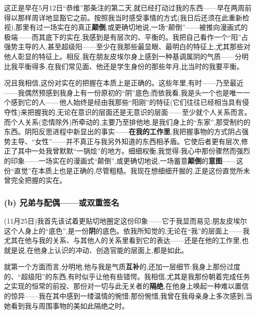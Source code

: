 这正是早在5月12日“恭维”那条注的第二天,就已经打动过我的东西\dmark{}——早在两周前得以那样周详地显豁它之前。按照我当时感受事情的方式(我日后还须在此重新检视),那里有过一场实在的真正\textbf{颠倒},或更确切地说,一场“颠倒”——被推向漫画式的极端——而其底下的实在,我感到是有层次的、平衡的。我把自己看作一个“阳”占强势主导的人,甚至超级阳——至少在我那些最显眼、最明白的特征上,尤其那些对他人彰显的特征上。相反,我在朋友皮埃尔身上感到一种基调属阴的气质——分明比我平衡得多,在我们常见面、他还是学生身份的那些年月,比当时的我要平衡。

况且我相信,这份对实在的把握在本质上是正确的。这些年里,有时——乃至最近——我偶然预感到我身上有一份原初的“阴”底色;而依我看,我是头一个也是唯一一个感到它的人——他人始终是经由我那些“阳刚”的特征(它们往往已经相当具有侵夺性)来把握我的,无论在意识的层面还是无意识的层面——至少就个人关系而言。而个人关系(恋情除外)所牵动的,主要乃至排他地,是我们身上的“东家”,那受制约的东西。阴阳反思进程中新显出的事实——\textbf{在我的工作里},我把握事物的方式阴占强势主导、“女性”——并不真正与我另外知道的东西相矛盾。它使后者更有层次,修正了其中一处我曾默默“一锅烩”的地方。细细权衡,我觉得:我心中那份骤然而强烈的印象——一场实在的漫画式“颠倒”,或更确切地说,一场蓄意\textbf{颠倒}的\textbf{意图}——这份“直觉”在本质上也是正确的,尽管粗糙。我现在想细细开掘的,正是这份直觉所未曾完全把握的实在。

\subsubsection*{(b) 兄弟与配偶——或双重签名}
\label{ch18:local:h45}

\label{ch18:local:n40}

\dmark{}(11月25日)我首先该试着更贴切地圈定这份印象——它于我显而易见:朋友皮埃尔这个人身上的“底色”,是一份\textbf{阴}的底色。依我所知觉的,无论在“我”的层面上——我尤其在他与我的关系、与其他人的关系里看到它的表达——还是在他的工作里,也就是说,在他身上认识的冲动、创造官能的层面上,都是如此。

就第一个方面而言,分明地,他与我是气质\textbf{互补}的,还加一层细节:我身上那份过度的、“超级阳”的东西,有时似乎让他有些错愕。我相信,尤其是我那份朝着完成任务之实现的恒常的前投、那份对一切与此无关者的\textbf{隔绝},在他身上唤起一种难以置信的惊异——我在其中感到一缕温情的惋惜:那份惋惜,我曾在我母亲身上多次感到,当她看到我与周围事物的美如此隔绝之时。

